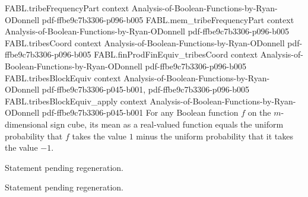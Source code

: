 \begin{theorem}
  {FABL.tribeFrequencyPart}
  {context}
  {Analysis-of-Boolean-Functions-by-Ryan-ODonnell}
  {pdf-ffbe9c7b3306-p096-b005}
\proofstep
  {FABL.mem_tribeFrequencyPart}
  {context}
  {Analysis-of-Boolean-Functions-by-Ryan-ODonnell}
  {pdf-ffbe9c7b3306-p096-b005}
\proofstep
  {FABL.tribesCoord}
  {context}
  {Analysis-of-Boolean-Functions-by-Ryan-ODonnell}
  {pdf-ffbe9c7b3306-p096-b005}
\proofstep
  {FABL.finProdFinEquiv_tribesCoord}
  {context}
  {Analysis-of-Boolean-Functions-by-Ryan-ODonnell}
  {pdf-ffbe9c7b3306-p096-b005}
\proofstep
  {FABL.tribesBlockEquiv}
  {context}
  {Analysis-of-Boolean-Functions-by-Ryan-ODonnell}
  {pdf-ffbe9c7b3306-p045-b001,
    pdf-ffbe9c7b3306-p096-b005}
\proofstep
  {FABL.tribesBlockEquiv_apply}
  {context}
  {Analysis-of-Boolean-Functions-by-Ryan-ODonnell}
  {pdf-ffbe9c7b3306-p045-b001}
For any Boolean function $f$ on the $m$-dimensional sign cube, its mean as a real-valued
function equals the uniform probability that $f$ takes the value $1$ minus the uniform
probability that it takes the value $-1$.
\end{theorem}

\begin{theorem}
\label{FABL.fourierCoeff_tribes_empty}
\leanok
{}
Statement pending regeneration.
\end{theorem}

\begin{theorem}
\label{FABL.signValue_andFunction}
\leanok
{}
Statement pending regeneration.
\end{theorem}

